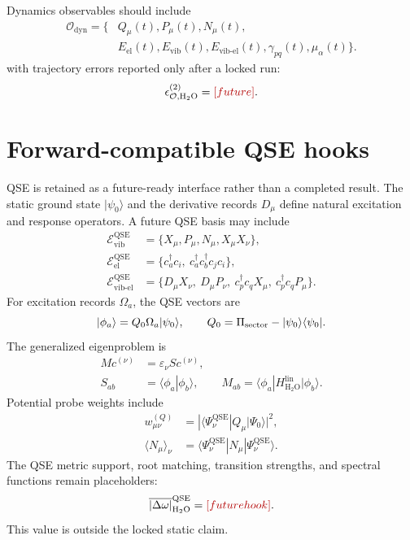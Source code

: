 \documentclass[
  reprint,
  amsmath,
  amssymb,
  aps,
  pra,
  nofootinbib,
  superscriptaddress,
  floatfix
]{revtex4-2}
\newcommand{\placeholder}[1]{\textcolor{red!70!black}{\ifmmode\left[#1\right]\else\textsf{[#1]}\fi}}
\newcommand{\ket}[1]{|#1\rangle}
\newcommand{\bra}[1]{\langle #1|}
\newcommand{\braket}[2]{\langle #1|#2\rangle}
\newcommand{\expval}[1]{\langle #1\rangle}
\newcommand{\Ecal}{\mathcal{E}}
\newcommand{\Ocal}{\mathcal{O}}
\newcommand{\dyn}{\mathrm{dyn}}
\newcommand{\qse}{\mathrm{QSE}}
\newcommand{\el}{\mathrm{el}}
\newcommand{\vib}{\mathrm{vib}}
\newcommand{\vibel}{\mathrm{vib}\text{-}\mathrm{el}}
\newcommand{\HtwoO}{\mathrm{H_2O}}
\newcommand{\lin}{\mathrm{lin}}
\begin{document}
Dynamics observables should include
\begin{align}
\Ocal_{\dyn}
=
\{&
Q_\mu(t),P_\mu(t),N_\mu(t),
\nonumber\\
&
E_{\el}(t),E_{\vib}(t),E_{\vibel}(t),
\gamma_{pq}(t),\mu_\alpha(t)
\}.
\label{eq:dynamics_observables}
\end{align}
with trajectory errors reported only after a locked run:
\begin{equation}
\epsilon_{\Ocal,\HtwoO}^{(2)}
=
\placeholder{future}.
\label{eq:h2o_dyn_placeholder}
\end{equation}

\section{Forward-compatible QSE hooks}
\label{sec:qse_hooks}

QSE is retained as a future-ready interface rather than a completed result.  The static ground state \(\ket{\psi_0}\) and the derivative records \(D_\mu\) define natural excitation and response operators.  A future QSE basis may include
\begin{align}
\Ecal_{\vib}^{\qse}
&=
\{X_\mu,P_\mu,N_\mu,X_\mu X_\nu\},
\nonumber\\
\Ecal_{\el}^{\qse}
&=
\{c_a^\dagger c_i,\ c_a^\dagger c_b^\dagger c_jc_i\},
\nonumber\\
\Ecal_{\vibel}^{\qse}
&=
\{D_\mu X_\nu,\ D_\mu P_\nu,\ c_p^\dagger c_q X_\mu,\ c_p^\dagger c_q P_\mu\}.
\label{eq:qse_alphabet_hooks}
\end{align}
For excitation records \(\Omega_a\), the QSE vectors are
\begin{equation}
\ket{\phi_a}
=
Q_0\Omega_a\ket{\psi_0},
\qquad
Q_0=\Pi_{\rm sector}-\ket{\psi_0}\bra{\psi_0}.
\label{eq:qse_vectors}
\end{equation}
The generalized eigenproblem is
\begin{align}
M c^{(\nu)}
&=
\varepsilon_\nu S c^{(\nu)},
\nonumber\\
S_{ab}
&=
\braket{\phi_a}{\phi_b},
\qquad
M_{ab}
=
\bra{\phi_a}H_{\HtwoO}^{\lin}\ket{\phi_b}.
\label{eq:qse_gep}
\end{align}
Potential probe weights include
\begin{align}
w_{\mu\nu}^{(Q)}
&=
|\bra{\Psi_\nu^{\qse}}Q_\mu\ket{\Psi_0}|^2,
\nonumber\\
\expval{N_\mu}_\nu
&=
\bra{\Psi_\nu^{\qse}}N_\mu\ket{\Psi_\nu^{\qse}}.
\label{eq:qse_character}
\end{align}
The QSE metric support, root matching, transition strengths, and spectral functions remain placeholders:
\begin{equation}
\overline{|\Delta\omega|}_{\HtwoO}^{\qse}
=
\placeholder{future hook}.
\label{eq:qse_placeholder}
\end{equation}
This value is outside the locked static claim.
\end{document}
